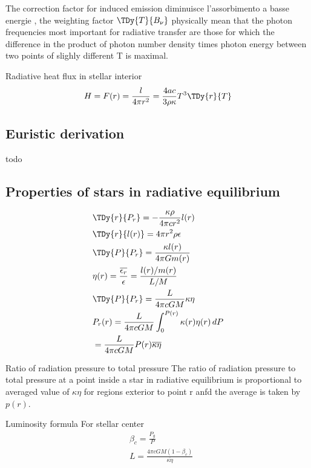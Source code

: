 \documentclass[oneside,12pt,fleqn]{memoir}
\begin{document}
The correction factor for induced emission diminuisce l'assorbimento a basse energie , the weighting factor $\TDy{T}{B_{\nu}}$ physically mean that the photon frequencies most important for radiative transfer are those for which the difference in the product of photon number density times photon energy between two points of slighly different T is maximal.

\begin{usefull}{Radiative heat flux in stellar interior}
\begin{equation*}
H=F(r)=\frac{l}{4\pi r^2}=\frac{4ac}{3\rho\kappa}T^3\TDy{r}{T}
\end{equation*}
\end{usefull}


\subsection{Euristic derivation}
todo

\subsection{Properties of stars in radiative equilibrium}

\begin{align*}
&\TDy{r}{P_r}=-\frac{\kappa\rho}{4\pi cr^2}l(r)\\
&\TDy{r}{l(r)}=4\pi r^2\rho\epsilon\\
&\TDy{P}{P_r}=\frac{\kappa l(r)}{4\pi G m(r)}\\
&\eta(r)=\frac{\overline{\epsilon_r}}{\epsilon}=\frac{l(r)/m(r)}{L/M}\\
&\TDy{P}{P_r}=\frac{L}{4\pi cGM}\kappa\eta\\
&P_r(r)=\frac{L}{4\pi cGM}\int_0^{P(r)}\kappa(r)\eta(r)\,dP\\
&=\frac{L}{4\pi cGM}P(r)\overline{\kappa\eta}
\end{align*}


\begin{usefull}{Ratio of radiation pressure to total pressure}
The ratio of radiation pressure to total pressure at a point inside a star in radiative equilibrium is proportional to averaged value of $\kappa\eta$ for regions exterior to point r anfd the average is taken by $p(r)$.

\end{usefull}

\begin{usefull}{Luminosity formula}
For stellar center
\begin{align*}
&\beta_c=\frac{P_g}{P}\\
&L=\frac{4\pi cGM(1-\beta_c)}{\overline{\kappa\eta}}
\end{align*}
\end{usefull}
\end{document}
